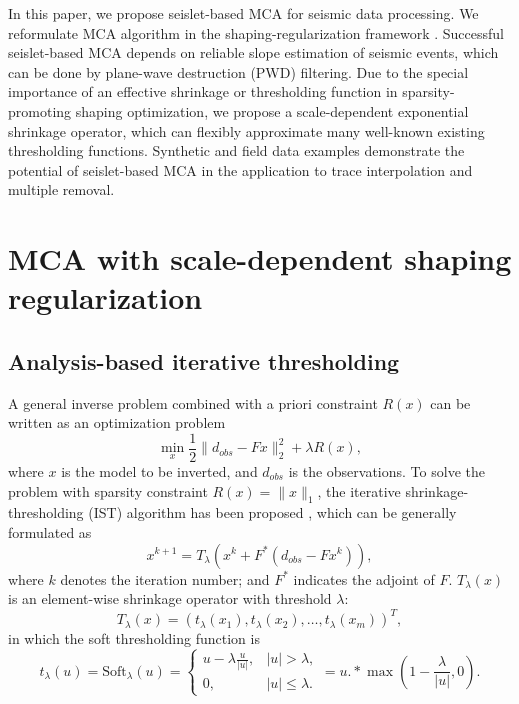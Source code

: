 In this paper, we propose seislet-based MCA for seismic data processing. We reformulate MCA algorithm in the shaping-regularization framework \citep{fomel2007shaping,fomel2008nonlinear}. Successful seislet-based MCA depends on reliable slope estimation of seismic events, which can be done by plane-wave destruction (PWD) filtering. Due to the special importance of an effective shrinkage or thresholding function in sparsity-promoting shaping optimization, we propose a scale-dependent exponential shrinkage operator, which can flexibly  approximate many well-known existing thresholding functions. Synthetic and field data examples demonstrate the potential of seislet-based MCA in the application to trace interpolation and multiple removal.


\section{MCA with scale-dependent shaping regularization}

\subsection{Analysis-based iterative thresholding}

A general inverse problem combined with a priori constraint $R(x)$ can be written as an optimization problem
\begin{equation}\label{eq:sparsity3}
  \min_x \frac{1}{2}\|d_{obs}-F x\|_2^2+\lambda R(x),
\end{equation}
where $x$ is the model to be inverted, and $d_{obs}$ is the observations. To solve the problem with sparsity constraint $R(x)=\|x\|_1$, the iterative shrinkage-thresholding (IST) algorithm has been proposed  \citep{daubechies2004iterative}, which can be generally formulated as
\begin{equation}\label{eq:IST}
   x^{k+1}=T_{\lambda}(x^{k}+F^*(d_{obs}-Fx^{k})),
 \end{equation}
 where $k$ denotes the iteration number; and $F^*$ indicates the adjoint of $F$. $T_{\lambda}(x)$ is an element-wise shrinkage operator with threshold $\lambda$:
 \begin{equation}
    T_{\lambda}(x)=(t_{\lambda}(x_1),t_{\lambda}(x_2),\ldots,t_{\lambda}(x_m))^T,
 \end{equation}
in which  the soft thresholding function \citep{donoho1995noising} is
 \begin{equation}
  t_{\lambda}(u)=\mathrm{Soft}_{\lambda}(u)=\left\{\begin{array}{ll}
                           u-\lambda\frac{u}{|u|}, & |u|> \lambda,\\
                           0, & |u|\leq \lambda.
                         \end{array}  \right.
	=u.*\max(1-\frac{\lambda}{|u|},0).
 \end{equation}

